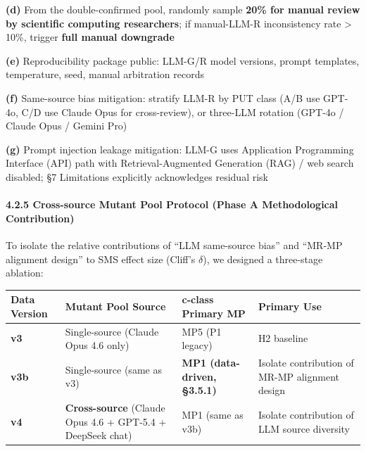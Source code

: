 \documentclass[review,12pt,authoryear]{elsarticle}
\begin{document}
\textbf{(d)} From the double-confirmed pool, randomly sample
\textbf{20\% for manual review by scientific computing researchers}; if
manual-LLM-R inconsistency rate \textgreater{} 10\%, trigger
\textbf{full manual downgrade}

\textbf{(e)} Reproducibility package public: LLM-G/R model versions,
prompt templates, temperature, seed, manual arbitration records

\textbf{(f)} Same-source bias mitigation: stratify LLM-R by PUT class
(A/B use GPT-4o, C/D use Claude Opus for cross-review), or three-LLM
rotation (GPT-4o / Claude Opus / Gemini Pro)

\textbf{(g)} Prompt injection leakage mitigation: LLM-G uses Application
Programming Interface (API) path with Retrieval-Augmented Generation
(RAG) / web search disabled; §7 Limitations explicitly acknowledges
residual risk

\paragraph{4.2.5 Cross-source Mutant Pool Protocol (Phase A
Methodological
Contribution)}\label{cross-source-mutant-pool-protocol-phase-a-methodological-contribution}

To isolate the relative contributions of ``LLM same-source bias'' and
``MR-MP alignment design'' to SMS effect size (Cliff's $\delta$), we designed a
three-stage ablation:

{\def\LTcaptype{none} %
\begin{longtable}[]{@{}
  >{\raggedright\arraybackslash}p{}
  >{\raggedright\arraybackslash}p{}
  >{\raggedright\arraybackslash}p{}
  >{\raggedright\arraybackslash}p{}@{}}
\toprule\noalign{}
\begin{minipage}[b]{\linewidth}\raggedright
Data Version
\end{minipage} & \begin{minipage}[b]{\linewidth}\raggedright
Mutant Pool Source
\end{minipage} & \begin{minipage}[b]{\linewidth}\raggedright
c-class Primary MP
\end{minipage} & \begin{minipage}[b]{\linewidth}\raggedright
Primary Use
\end{minipage} \\
\midrule\noalign{}
\endhead
\bottomrule\noalign{}
\endlastfoot
\textbf{v3} & Single-source (Claude Opus 4.6 only) & MP5 (P1 legacy) &
H2 baseline \\
\textbf{v3b} & Single-source (same as v3) & \textbf{MP1 (data-driven,
§3.5.1)} & Isolate contribution of MR-MP alignment design \\
\textbf{v4} & \textbf{Cross-source} (Claude Opus 4.6 + GPT-5.4 +
DeepSeek chat) & MP1 (same as v3b) & Isolate contribution of LLM source
diversity \\
\end{longtable}
}
\end{document}

